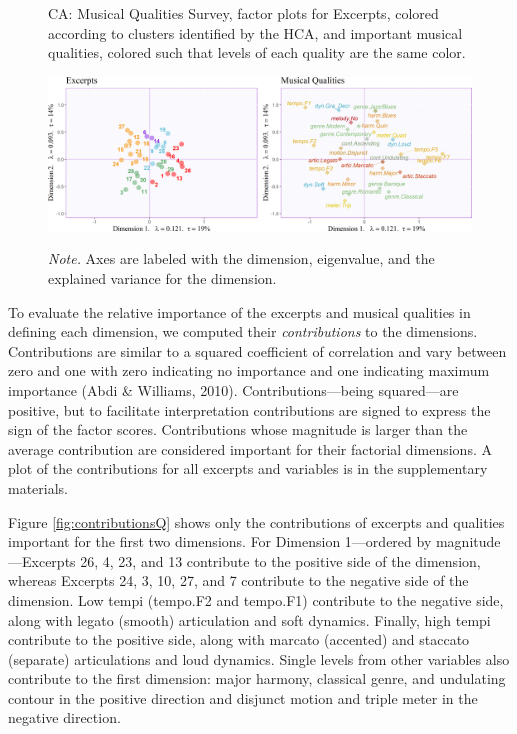 \documentclass[
  english,
  man,floatsintext]{apa6}
\begin{document}
\begin{figure}   
  \centering  
  \caption{CA: Musical Qualities Survey, factor plots for Excerpts, colored according to clusters identified by the HCA, and important musical qualities, colored such that levels of each quality are the same color.}
    \includegraphics{./Music-Descriptor-Space_files/figure-latex/factormapsQcode-1.png}
  \label{fig:factormapsQ}
  \caption*{\footnotesize \textit{Note.} Axes are labeled with the dimension, eigenvalue, and the explained variance for the dimension. }
\end{figure}

To evaluate the relative importance of the excerpts and musical qualities in defining each dimension, we computed their \emph{contributions} to the dimensions. Contributions are similar to a squared coefficient of correlation and vary between zero and one with zero indicating no importance and one indicating maximum importance (Abdi \& Williams, 2010). Contributions---being squared---are positive, but to facilitate interpretation contributions are signed to express the sign of the factor scores. Contributions whose magnitude is larger than the average contribution are considered important for their factorial dimensions. A plot of the contributions for all excerpts and variables is in the supplementary materials.

Figure \ref{fig:contributionsQ} shows only the contributions of excerpts and qualities important for the first two dimensions. For Dimension 1---ordered by magnitude---Excerpts 26, 4, 23, and 13 contribute to the positive side of the dimension, whereas Excerpts 24, 3, 10, 27, and 7 contribute to the negative side of the dimension. Low tempi (tempo.F2 and tempo.F1) contribute to the negative side, along with legato (smooth) articulation and soft dynamics. Finally, high tempi contribute to the positive side, along with marcato (accented) and staccato (separate) articulations and loud dynamics. Single levels from other variables also contribute to the first dimension: major harmony, classical genre, and undulating contour in the positive direction and disjunct motion and triple meter in the negative direction.
\end{document}
